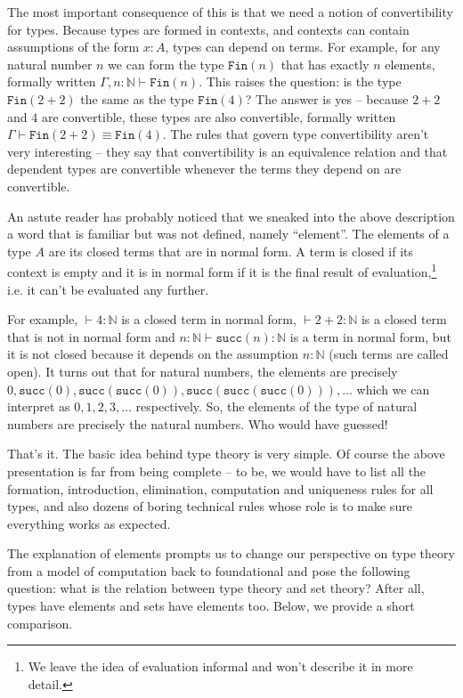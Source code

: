 \documentclass[declaration,mgr,english,shortabstract]{iithesis}
\newcommand{\m}[1]{\texttt{#1}}
\newcommand{\type}[2]{#1 \vdash #2}
\newcommand{\typeconv}[3]{#1 \vdash #2 \equiv #3}
\newcommand{\term}[3]{#1 \vdash #2 : #3}
\newcommand{\N}{\mathbb{N}}
\newcommand{\suc}[1]{\m{succ}(#1)}
\newcommand{\Fin}[1]{\m{Fin}(#1)}
\begin{document}
The most important consequence of this is that we need a notion of convertibility for types. Because types are formed in contexts, and contexts can contain assumptions of the form $x : A$, types can depend on terms. For example, for any natural number $n$ we can form the type $\Fin{n}$ that has exactly $n$ elements, formally written $\type{\Gamma, n : \N}{\Fin{n}}$. This raises the question: is the type $\Fin{2 + 2}$ the same as the type $\Fin{4}$? The answer is yes -- because $2 + 2$ and $4$ are convertible, these types are also convertible, formally written $\typeconv{\Gamma}{\Fin{2 + 2}}{\Fin{4}}$. The rules that govern type convertibility aren't very interesting -- they say that convertibility is an equivalence relation and that dependent types are convertible whenever the terms they depend on are convertible.

An astute reader has probably noticed that we sneaked into the above description a word that is familiar but was not defined, namely ``element''. The elements of a type $A$ are its closed terms that are in normal form. A term is closed if its context is empty and it is in normal form if it is the final result of evaluation,\footnote{We leave the idea of evaluation informal and won't describe it in more detail.} i.e. it can't be evaluated any further.

For example, $\term{}{4}{\N}$ is a closed term in normal form, $\term{}{2 + 2}{\N}$ is a closed term that is not in normal form and $\term{n : \N}{\suc{n}}{\N}$ is a term in normal form, but it is not closed because it depends on the assumption $n : \N$ (such terms are called open). It turns out that for natural numbers, the elements are precisely $0, \suc{0}, \suc{\suc{0}}, \suc{\suc{\suc{0}}}, \dots$ which we can interpret as $0, 1, 2, 3, \dots$ respectively. So, the elements of the type of natural numbers are precisely the natural numbers. Who would have guessed!

That's it. The basic idea behind type theory is very simple. Of course the above presentation is far from being complete -- to be, we would have to list all the formation, introduction, elimination, computation and uniqueness rules for all types, and also dozens of boring technical rules whose role is to make sure everything works as expected.

The explanation of elements prompts us to change our perspective on type theory from a model of computation back to foundational and pose the following question: what is the relation between type theory and set theory? After all, types have elements and sets have elements too. Below, we provide a short comparison.
\end{document}
